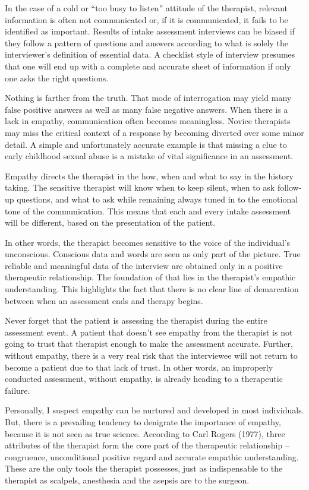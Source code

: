 \documentclass[]{book}
\begin{document}
In the case of a cold or ``too busy to listen'' attitude of the therapist, relevant information is often not communicated or, if it is communicated, it fails to be identified as important. Results of intake assessment interviews can be biased if they follow a pattern of questions and answers according to what is solely the interviewer's definition of essential data. A checklist style of interview presumes that one will end up with a complete and accurate sheet of information if only one asks the right questions.

Nothing is farther from the truth. That mode of interrogation may yield many false positive answers as well as many false negative answers. When there is a lack in empathy, communication often becomes meaningless. Novice therapists may miss the critical context of a response by becoming diverted over some minor detail. A simple and unfortunately accurate example is that missing a clue to early childhood sexual abuse is a mistake of vital significance in an assessment.

Empathy directs the therapist in the how, when and what to say in the history taking. The sensitive therapist will know when to keep silent, when to ask follow-up questions, and what to ask while remaining always tuned in to the emotional tone of the communication. This means that each and every intake assessment will be different, based on the presentation of the patient.

In other words, the therapist becomes sensitive to the voice of the individual's unconscious. Conscious data and words are seen as only part of the picture. True reliable and meaningful data of the interview are obtained only in a positive therapeutic relationship. The foundation of that lies in the therapist's empathic understanding. This highlights the fact that there is no clear line of demarcation between when an assessment ends and therapy begins.

Never forget that the patient is assessing the therapist during the entire assessment event. A patient that doesn't see empathy from the therapist is not going to trust that therapist enough to make the assessment accurate. Further, without empathy, there is a very real risk that the interviewee will not return to become a patient due to that lack of trust. In other words, an improperly conducted assessment, without empathy, is already heading to a therapeutic failure.

Personally, I suspect empathy can be nurtured and developed in most individuals. But, there is a prevailing tendency to denigrate the importance of empathy, because it is not seen as true science. According to Carl Rogers (1977), three attributes of the therapist form the core part of the therapeutic relationship -- congruence, unconditional positive regard and accurate empathic understanding. These are the only tools the therapist possesses, just as indispensable to the therapist as scalpels, anesthesia and the asepsis are to the surgeon.
\end{document}
